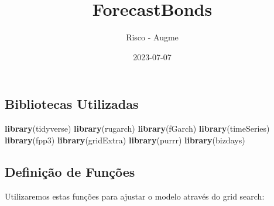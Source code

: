 \documentclass[
]{article}
\title{ForecastBonds}
\author{Risco - Augme}
\date{2023-07-07}
\newenvironment{Shaded}{\begin{snugshade}}{\end{snugshade}}
\newcommand{\FunctionTok}[1]{\textcolor[rgb]{0.13,0.29,0.53}{\textbf{#1}}}
\newcommand{\NormalTok}[1]{#1}
\begin{document}
\maketitle

\hypertarget{bibliotecas-utilizadas}{%
\subsection{Bibliotecas Utilizadas}\label{bibliotecas-utilizadas}}

\begin{Shaded}
\begin{Highlighting}[]
\FunctionTok{library}\NormalTok{(tidyverse)}
\FunctionTok{library}\NormalTok{(rugarch)}
\FunctionTok{library}\NormalTok{(fGarch)}
\FunctionTok{library}\NormalTok{(timeSeries)}
\FunctionTok{library}\NormalTok{(fpp3)}
\FunctionTok{library}\NormalTok{(gridExtra)}
\FunctionTok{library}\NormalTok{(purrr)}
\FunctionTok{library}\NormalTok{(bizdays)}
\end{Highlighting}
\end{Shaded}

\hypertarget{definiuxe7uxe3o-de-funuxe7uxf5es}{%
\subsection{Definição de
Funções}\label{definiuxe7uxe3o-de-funuxe7uxf5es}}

Utilizaremos estas funções para ajustar o modelo através do grid search:
\end{document}
